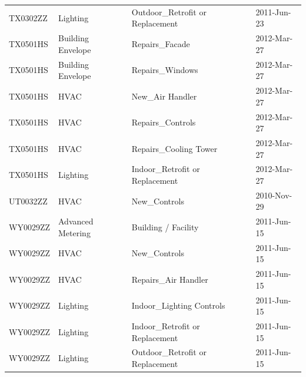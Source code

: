 \documentclass[12pt]{article}
\begin{document}
\begin{longtable}{lp{4cm}p{4cm}p{3cm}}
TX0302ZZ         & Lighting                                & Outdoor\_Retrofit or Replacement          & 2011-Jun-23                   \\
TX0501HS         & Building Envelope                       & Repairs\_Facade                           & 2012-Mar-27                   \\
TX0501HS         & Building Envelope                       & Repairs\_Windows                          & 2012-Mar-27                   \\
TX0501HS         & HVAC                                    & New\_Air Handler                          & 2012-Mar-27                   \\
TX0501HS         & HVAC                                    & Repairs\_Controls                         & 2012-Mar-27                   \\
TX0501HS         & HVAC                                    & Repairs\_Cooling Tower                    & 2012-Mar-27                   \\
TX0501HS         & Lighting                                & Indoor\_Retrofit or Replacement           & 2012-Mar-27                   \\
UT0032ZZ         & HVAC                                    & New\_Controls                             & 2010-Nov-29                   \\
WY0029ZZ         & Advanced Metering                       & Building / Facility                       & 2011-Jun-15                   \\
WY0029ZZ         & HVAC                                    & New\_Controls                             & 2011-Jun-15                   \\
WY0029ZZ         & HVAC                                    & Repairs\_Air Handler                      & 2011-Jun-15                   \\
WY0029ZZ         & Lighting                                & Indoor\_Lighting Controls                 & 2011-Jun-15                   \\
WY0029ZZ         & Lighting                                & Indoor\_Retrofit or Replacement           & 2011-Jun-15                   \\
WY0029ZZ         & Lighting                                & Outdoor\_Retrofit or Replacement          & 2011-Jun-15                  
\end{longtable}
\FloatBarrier
\newpage


\end{document}
